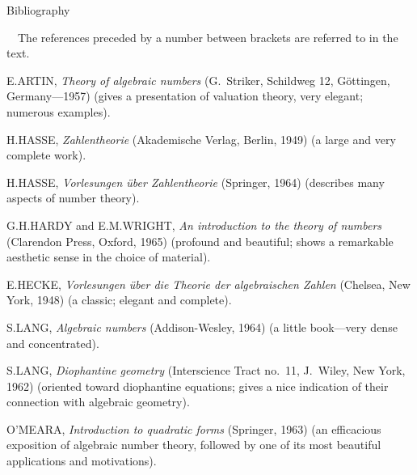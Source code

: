 \clearpage
{}%
\global\let\currentseccode\empty
\global\let\pagefirstsec\empty
\renewcommand{\chaptertitle}{}%
\def\currentsectitle{}%
\thispagestyle{emptyhead}%
{}%
\label{fm:bibliography}%
%
\begin{center}{\Large Bibliography}\end{center}%
\vspace{0.8\baselineskip}%
\noindent\footnotesize*\ \ The references preceded by a number between
brackets are referred to in the text.%
\vspace{1.0\baselineskip}%
\par
\normalsize

\begingroup
\setlength{\parindent}{0pt}%
\setlength{\parskip}{0.45\baselineskip}%

E.\thinspace ARTIN, \emph{Theory of algebraic numbers} (G.\ Striker,
Schildweg 12, Göttingen, Germany---1957) (gives a presentation of valuation
theory, very elegant; numerous examples).

H.\thinspace HASSE, \emph{Zahlentheorie} (Akademische Verlag, Berlin, 1949)
(a large and very complete work).

H.\thinspace HASSE, \emph{Vorlesungen über Zahlentheorie} (Springer, 1964)
(describes many aspects of number theory).

G.\thinspace H.\thinspace HARDY and E.\thinspace M.\thinspace WRIGHT,
\emph{An introduction to the theory of numbers} (Clarendon Press, Oxford,
1965) (profound and beautiful; shows a remarkable aesthetic sense in the
choice of material).

E.\thinspace HECKE, \emph{Vorlesungen über die Theorie der algebraischen
Zahlen} (Chelsea, New York, 1948) (a classic; elegant and complete).

S.\thinspace LANG, \emph{Algebraic numbers} (Addison-Wesley, 1964) (a little
book---very dense and concentrated).

S.\thinspace LANG, \emph{Diophantine geometry} (Interscience Tract no.~11,
J.\ Wiley, New York, 1962) (oriented toward diophantine equations; gives a
nice indication of their connection with algebraic geometry).

O'MEARA, \emph{Introduction to quadratic forms} (Springer, 1963) (an
efficacious exposition of algebraic number theory, followed by one of its
most beautiful applications and motivations).

